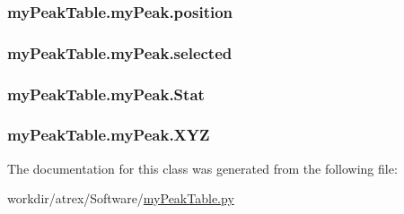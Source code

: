 \hypertarget{classmy_peak_table_1_1my_peak_a14e93826d7c0fa3bce77caa61002d545}{
\subsubsection[{position}]{\setlength{\rightskip}{0pt plus 5cm}my\-Peak\-Table.\-my\-Peak.\-position}}\label{classmy_peak_table_1_1my_peak_a14e93826d7c0fa3bce77caa61002d545}
\hypertarget{classmy_peak_table_1_1my_peak_a645f6926432f2d6f2a3c2a0ccdf2dfba}{
\subsubsection[{selected}]{\setlength{\rightskip}{0pt plus 5cm}my\-Peak\-Table.\-my\-Peak.\-selected}}\label{classmy_peak_table_1_1my_peak_a645f6926432f2d6f2a3c2a0ccdf2dfba}
\hypertarget{classmy_peak_table_1_1my_peak_a7c51e9bdbae2d5de7166bd7c3e3b65c7}{
\subsubsection[{Stat}]{\setlength{\rightskip}{0pt plus 5cm}my\-Peak\-Table.\-my\-Peak.\-Stat}}\label{classmy_peak_table_1_1my_peak_a7c51e9bdbae2d5de7166bd7c3e3b65c7}
\hypertarget{classmy_peak_table_1_1my_peak_a8b31f75e94aeffb31d8d0fc8f19857a5}{
\subsubsection[{X\-Y\-Z}]{\setlength{\rightskip}{0pt plus 5cm}my\-Peak\-Table.\-my\-Peak.\-X\-Y\-Z}}\label{classmy_peak_table_1_1my_peak_a8b31f75e94aeffb31d8d0fc8f19857a5}


The documentation for this class was generated from the following file\-:\begin{DoxyCompactItemize}
\item 
workdir/atrex/\-Software/\hyperlink{my_peak_table_8py}{my\-Peak\-Table.\-py}\end{DoxyCompactItemize}

